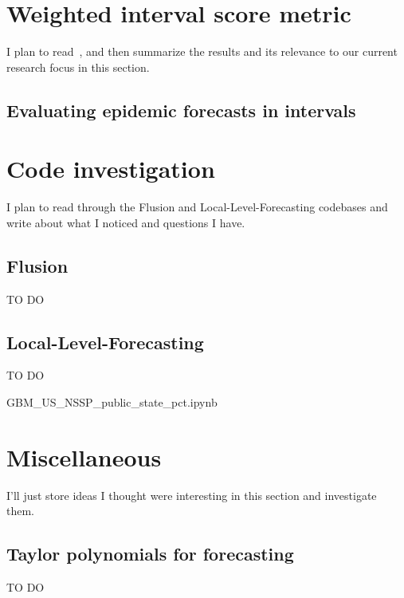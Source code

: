 \documentclass[12pt]{article}
\begin{document}
\section{Weighted interval score metric}
I plan to read~\cite{bracher21}, and then summarize the results and its relevance to our current research focus in this section.
\subsection{Evaluating epidemic forecasts in intervals}

\section{Code investigation}
I plan to read through the Flusion and Local-Level-Forecasting codebases and write about what I noticed and questions I have.
\subsection{Flusion}
TO DO
\subsection{Local-Level-Forecasting}
TO DO

GBM\_US\_NSSP\_public\_state\_pct.ipynb

\section{Miscellaneous}
I'll just store ideas I thought were interesting in this section and investigate them.
\subsection{Taylor polynomials for forecasting}
TO DO


\printbibliography
\end{document}
